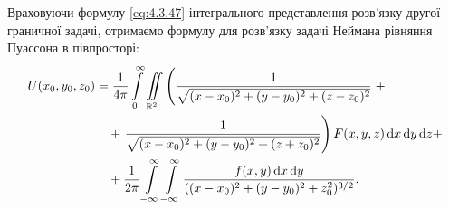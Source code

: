 Враховуючи формулу \eqref{eq:4.3.47} інтегрального представлення розв'язку другої граничної задачі, отримаємо формулу для розв'язку задачі Неймана рівняння Пуассона в півпросторі:
\begin{equation}
	\begin{aligned}
		U(x_0, y_0, z_0) &= \frac{1}{4 \pi} \displaystyle\int\limits_0^\infty \displaystyle\iint\limits_{\mathbb{R}^2} \left( \frac{1}{\sqrt{(x - x_0)^2 + (y - y_0)^2 + (z - z_0)^2}} \right. + \\
		& \quad + \left. \frac{1}{\sqrt{(x - x_0)^2 + (y - y_0)^2 + (z + z_0)^2}} \right) F(x, y, z) \mathop{}\!\mathrm{d} x \mathop{}\!\mathrm{d} y \mathop{}\!\mathrm{d} z + \\
		& \quad + \frac{1}{2 \pi} \displaystyle\int\limits_{-\infty}^\infty \displaystyle\int\limits_{-\infty}^\infty \frac{f(x, y) \mathop{}\!\mathrm{d} x \mathop{}\!\mathrm{d} y}{((x - x_0)^2 + (y - y_0)^2 + z_0^2)^{3/2}}.
	\end{aligned}
\end{equation}